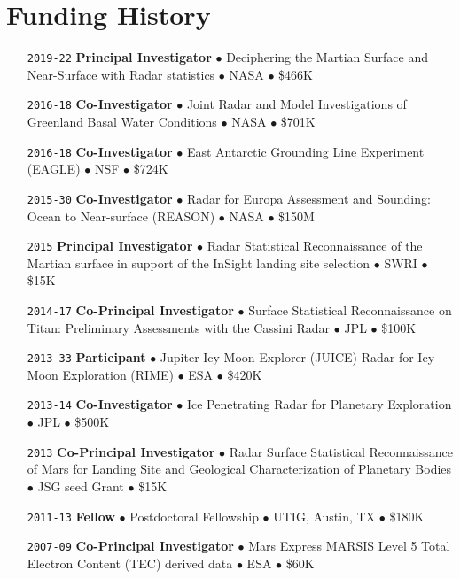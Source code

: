 \section*{Funding History}

\begin{itemize}[leftmargin=5.8em, labelsep=1.5em]
    \setlength\itemsep{-.3em}
    
    \item[\texttt{2019-22}] \textbf{Principal Investigator} $\bullet$ Deciphering the Martian Surface and Near-Surface with Radar statistics $\bullet$ NASA $\bullet$ \$466K
    
    \item[\texttt{2016-18}] \textbf{Co-Investigator} $\bullet$ Joint Radar and Model Investigations of Greenland Basal Water Conditions $\bullet$ NASA $\bullet$ \$701K
    
    \item[\texttt{2016-18}] \textbf{Co-Investigator} $\bullet$ East Antarctic Grounding Line Experiment (EAGLE) $\bullet$ NSF $\bullet$ \$724K
    
    \item[\texttt{2015-30}] \textbf{Co-Investigator} $\bullet$ Radar for Europa Assessment and Sounding: Ocean to Near-surface (REASON) $\bullet$ NASA $\bullet$ \$150M
    
    \item[\texttt{2015}] \textbf{Principal Investigator} $\bullet$ Radar Statistical Reconnaissance of the Martian surface in support of the InSight landing site selection $\bullet$ SWRI $\bullet$ \$15K
    
    \item[\texttt{2014-17}] \textbf{Co-Principal Investigator} $\bullet$ Surface Statistical Reconnaissance on Titan: Preliminary Assessments with the Cassini Radar $\bullet$ JPL $\bullet$ \$100K
    
    \item[\texttt{2013-33}] \textbf{Participant} $\bullet$ Jupiter Icy Moon  Explorer (JUICE) Radar for Icy Moon Exploration (RIME) $\bullet$ ESA $\bullet$ \$420K
    
    \item[\texttt{2013-14}] \textbf{Co-Investigator} $\bullet$ Ice Penetrating Radar for Planetary Exploration $\bullet$ JPL $\bullet$ \$500K
    
    \item[\texttt{2013}] \textbf{Co-Principal Investigator} $\bullet$ Radar Surface Statistical Reconnaissance of Mars for Landing Site and Geological Characterization of Planetary Bodies $\bullet$ JSG seed Grant $\bullet$ \$15K
    
    \item[\texttt{2011-13}] \textbf{Fellow} $\bullet$ Postdoctoral Fellowship $\bullet$ UTIG, Austin, TX $\bullet$ \$180K
    
    \item[\texttt{2007-09}] \textbf{Co-Principal Investigator} $\bullet$ Mars Express MARSIS Level 5 Total Electron Content (TEC) derived data $\bullet$ ESA $\bullet$ \$60K
\end{itemize}